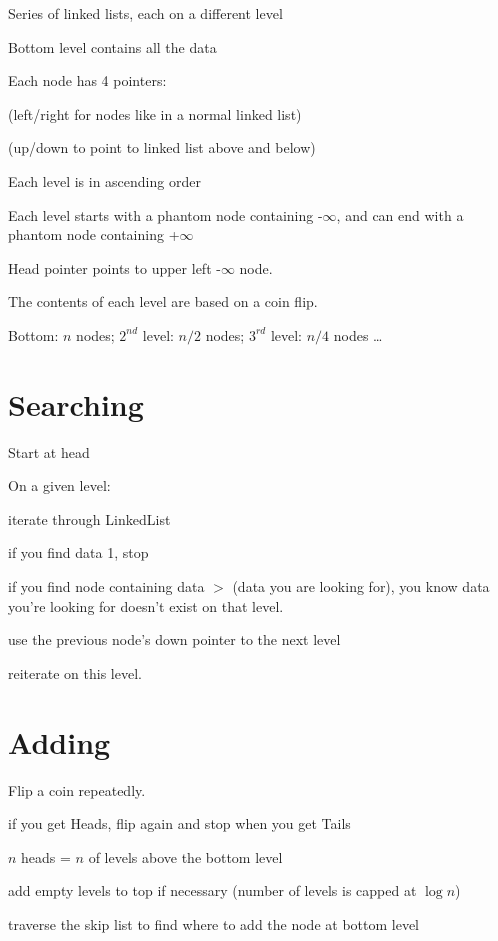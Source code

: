 \documentclass[english,openany]{book}
\begin{document}
    Series of linked lists, each on a different level

    Bottom level contains all the data

    Each node has 4 pointers:

     (left/right for nodes like in a normal linked list)

     (up/down to point to linked list above and below)

    Each level is in ascending order

    Each level starts with a phantom node containing -$\infty$, and can end with a phantom node containing +$\infty$

    Head pointer points to upper left -$\infty$ node.

    The contents of each level are based on a coin flip.

    Bottom: $n$ nodes; $2^{nd}$ level: $n/2$ nodes; $3^{rd}$ level: $n/4$ nodes \dots\\

    \section{Searching}

    Start at head

    On a given level:

    \quad iterate through LinkedList

    \quad\quad if you find data 1, stop

    \quad\quad if you find node containing data $>$ (data you are looking for), you know data you're looking for doesn't exist on that level.

    \quad\quad use the previous node's down pointer to the next level

    \quad\quad reiterate on this level.\\

    \section{Adding}

    Flip a coin repeatedly.

    \quad if you get Heads, flip again and stop when you get Tails

    \quad $n$ heads = $n$ of levels above the bottom level

    \quad add empty levels to top if necessary (number of levels is capped at $\log n$)

    \quad traverse the skip list to find where to add the node at bottom level
\end{document}
